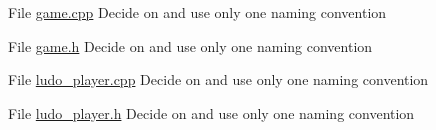 
\begin{DoxyRefList}
\item[File \mbox{\hyperlink{game_8cpp}{game.cpp}} ]\label{todo__todo000001}%
%
Decide on and use only one naming convention  
\item[File \mbox{\hyperlink{game_8h}{game.h}} ]\label{todo__todo000003}%
%
Decide on and use only one naming convention  
\item[File \mbox{\hyperlink{ludo__player_8cpp}{ludo\+\_\+player.cpp}} ]\label{todo__todo000002}%
%
Decide on and use only one naming convention  
\item[File \mbox{\hyperlink{ludo__player_8h}{ludo\+\_\+player.h}} ]\label{todo__todo000004}%
%
Decide on and use only one naming convention 
\end{DoxyRefList}